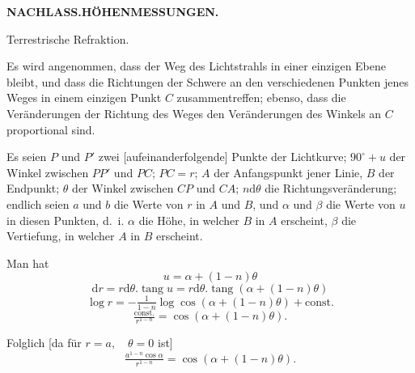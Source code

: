 \par\clearpage
\noindent\null\hfill{\small\textbf{NACHLASS.\quad HÖHENMESSUNGEN.}}\hfill{}\par
\vspace*{2.4cm}
\begin{center}{\Large\textbf{}}\par\vspace{1.3cm}
Terrestrische Refraktion.\par\medskip
[1.]
\end{center}
\par\noindent\hspace*{\parindent}Es wird angenommen, dass der Weg des Lichtstrahls in einer einzigen Ebene
bleibt, und dass die Richtungen der Schwere an den verschiedenen Punkten
jenes Weges in einem einzigen Punkt \(C\) zusammentreffen; ebenso, dass die Veränderungen der Richtung des Weges den Veränderungen des Winkels an \(C\)
proportional sind.
\par\noindent\hspace*{\parindent}Es seien \(P\) und \(P'\) zwei [aufeinanderfolgende] Punkte der Lichtkurve;
\(90^\circ+u\) der Winkel zwischen \(PP'\) und \(PC\); \(PC=r\); \(A\) der Anfangspunkt
jener Linie, \(B\) der Endpunkt; \(\theta\) der Winkel zwischen \(CP\) und \(CA\); \(n\mathrm{d}\theta\) die
Richtungsveränderung; endlich seien \(a\) und \(b\) die Werte von \(r\) in \(A\) und \(B\),
und \(\alpha\) und \(\beta\) die Werte von \(u\) in diesen Punkten, d.~i. \(\alpha\) die Höhe, in welcher
\(B\) in \(A\) erscheint, \(\beta\) die Vertiefung, in welcher \(A\) in \(B\) erscheint.
\par\noindent\hspace*{\parindent}Man hat
\[u=\alpha+(1-n)\theta\]
\[\mathrm{d}r=r\mathrm{d}\theta.\operatorname{tang}u=r\mathrm{d}\theta.\operatorname{tang}(\alpha+(1-n)\theta)\]
\noindent [oder]
\[\log r=-\tfrac{1}{1-n}\log\cos(\alpha+(1-n)\theta)+\mathrm{const.}\]
\[\tfrac{\mathrm{const.}}{r^{1-n}}=\cos(\alpha+(1-n)\theta).\]
\par\noindent\hspace*{\parindent}Folglich [da für \(r=a,\quad\theta=0\) ist]
\[\tfrac{a^{1-n}\cos\alpha}{r^{1-n}}=\cos(\alpha+(1-n)\theta).\]

